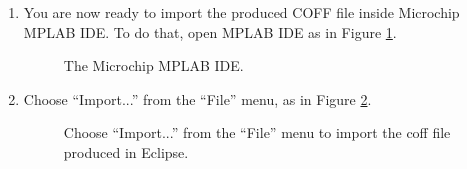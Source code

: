 \begin{enumerate}
  
\item
  You are now ready to import the produced COFF file inside Microchip
  MPLAB IDE. To do that, open MPLAB IDE as in Figure \ref{fig:mplab1}.
%
\begin{figure}[htb]
\caption{The Microchip MPLAB IDE.}
\label{fig:mplab1}
\end{figure}

\item
  Choose ``Import...'' from the ``File'' menu, as in Figure \ref{fig:mplab2}.
%
\begin{figure}[htb]
\caption{Choose ``Import...'' from the ``File'' menu to import the coff file produced in Eclipse.}
\label{fig:mplab2}
\end{figure}


\end{enumerate}
